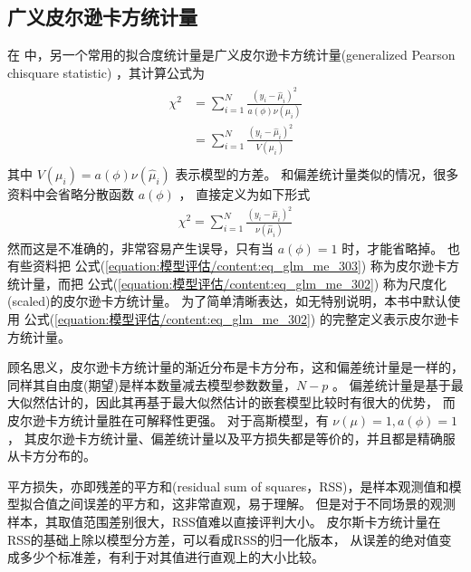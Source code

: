 \documentclass[letterpaper,10pt,english]{sphinxmanual}
\begin{document}
\subsection{广义皮尔逊卡方统计量}
\label{\detokenize{_u6a21_u578b_u8bc4_u4f30/content:ch-glm-gof-chi}}\label{\detokenize{_u6a21_u578b_u8bc4_u4f30/content:id8}}
在  中，另一个常用的拟合度统计量是广义皮尔逊卡方统计量(generalized Pearson chi\sphinxhyphen{}square statistic)
，其计算公式为
\begin{align}\label{equation:模型评估/content:eq_glm_me_302}\!\begin{aligned}
\chi^2 &= \sum_{i=1}^N  \frac{(y_i-\hat{\mu}_i)^2}{a(\phi)\nu(\hat{\mu}_i)}\\
&= \sum_{i=1}^N  \frac{(y_i-\hat{\mu}_i)^2}{V(\mu_i)}\\
\end{aligned}\end{align}
其中 \(V(\mu_i)=a(\phi)\nu(\hat{\mu}_i)\) 表示模型的方差。
和偏差统计量类似的情况，很多资料中会省略分散函数 \(a(\phi)\) ，
直接定义为如下形式
\begin{equation}\label{equation:模型评估/content:eq_glm_me_303}
\begin{split}\chi^2 = \sum_{i=1}^N  \frac{(y_i-\hat{\mu}_i)^2}{\nu(\hat{\mu}_i)}\end{split}
\end{equation}
然而这是不准确的，非常容易产生误导，只有当 \(a(\phi)=1\) 时，才能省略掉。
也有些资料把 公式(\ref{equation:模型评估/content:eq_glm_me_303}) 称为皮尔逊卡方统计量，而把 公式(\ref{equation:模型评估/content:eq_glm_me_302}) 称为尺度化(scaled)的皮尔逊卡方统计量。
为了简单清晰表达，如无特别说明，本书中默认使用 公式(\ref{equation:模型评估/content:eq_glm_me_302}) 的完整定义表示皮尔逊卡方统计量。

顾名思义，皮尔逊卡方统计量的渐近分布是卡方分布，这和偏差统计量是一样的，
同样其自由度(期望)是样本数量减去模型参数数量，\(N-p\) 。
偏差统计量是基于最大似然估计的，因此其再基于最大似然估计的嵌套模型比较时有很大的优势，
而皮尔逊卡方统计量胜在可解释性更强。
对于高斯模型，有 \(\nu(\mu)=1,a(\phi)=1\) ，
其皮尔逊卡方统计量、偏差统计量以及平方损失都是等价的，并且都是精确服从卡方分布的。

平方损失，亦即残差的平方和(residual sum of squares，RSS)，是样本观测值和模型拟合值之间误差的平方和，这非常直观，易于理解。
但是对于不同场景的观测样本，其取值范围差别很大，RSS值难以直接评判大小。
皮尔斯卡方统计量在RSS的基础上除以模型分方差，可以看成RSS的归一化版本，
从误差的绝对值变成多少个标准差，有利于对其值进行直观上的大小比较。
\end{document}
